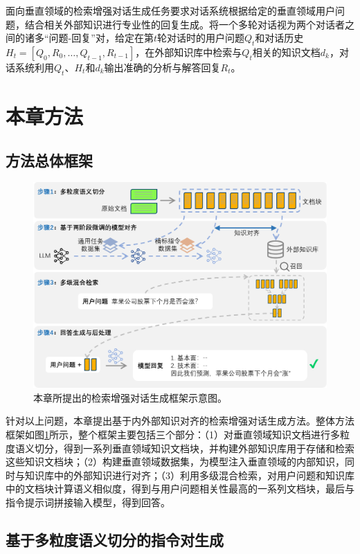 面向垂直领域的检索增强对话生成任务要求对话系统根据给定的垂直领域用户问题，结合相关外部知识进行专业性的回复生成。将一个多轮对话视为两个对话者之间的诸多“问题-回复”对，给定在第$t$轮对话时的用户问题$Q_t$和对话历史$H_t=[Q_0, R_0, …, Q_{t-1}, R_{t-1}]$，在外部知识库中检索与$Q_t$相关的知识文档$d_k$，对话系统利用$Q_t$、$H_t$和$d_k$输出准确的分析与解答回复$R_t$。

\section{本章方法}
\subsection{方法总体框架}

\begin{figure}[htbp]
	\centering
	\includegraphics[scale=0.65]{Fig/rag_framework.png}
	\caption{\label{rag_framework}本章所提出的检索增强对话生成框架示意图。}
\end{figure}

针对以上问题，本章提出基于内外部知识对齐的检索增强对话生成方法。整体方法框架如图\ref{rag_framework}所示，整个框架主要包括三个部分：（1）对垂直领域知识文档进行多粒度语义切分，得到一系列垂直领域知识文档块，并构建外部知识库用于存储和检索这些知识文档块；（2）构建垂直领域数据集，为模型注入垂直领域的内部知识，同时与知识库中的外部知识进行对齐；（3）利用多级混合检索，对用户问题和知识库中的文档块计算语义相似度，得到与用户问题相关性最高的一系列文档块，最后与指令提示词拼接输入模型，得到回答。

\subsection{基于多粒度语义切分的指令对生成}

